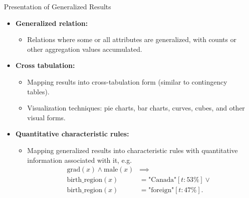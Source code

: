 \begin{frame}{Presentation of Generalized Results}
  \begin{itemize}
  \item \textbf{Generalized relation:}
    \begin{itemize}
    \item Relations where some or all attributes are generalized, with counts or other aggregation values accumulated.
    \end{itemize}
  \item \textbf{Cross tabulation:}
    \begin{itemize}
    \item Mapping results into cross-tabulation form (similar to contingency tables).
    \item Visualization techniques: pie charts, bar charts, curves, cubes, and other visual forms.
    \end{itemize}
  \item \textbf{Quantitative characteristic rules:}
    \begin{itemize}
    \item Mapping generalized results into characteristic rules with quantitative information associated with it, e.g.
      \begin{align}
        \text{grad}(x) \wedge \text{male}(x) &\implies\\
        \text{birth\_region}(x) &= \text{"Canada"}[t:53\%] \lor\\
        \text{birth\_region}(x) &= \text{"foreign"}[t:47\%].
      \end{align}
    \end{itemize}
  \end{itemize}
\end{frame}


